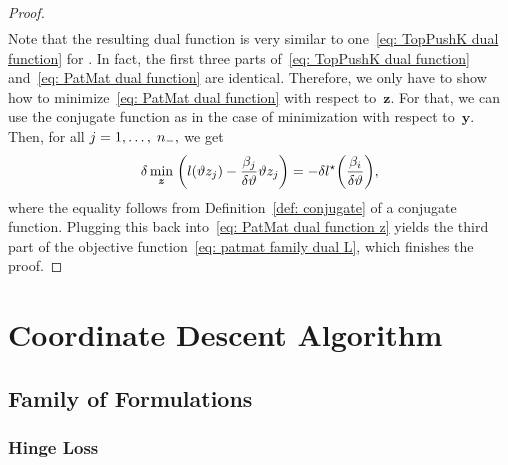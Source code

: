 \begin{proof}
\begin{subequations}
\begin{align}
    \end{align}
  \end{subequations}
  Note that the resulting dual function is very similar to one~\eqref{eq: TopPushK dual function} for \TopPushK. In fact, the first three parts of~\eqref{eq: TopPushK dual function} and~\eqref{eq: PatMat dual function} are identical. Therefore, we only have to show how to minimize~\eqref{eq: PatMat dual function} with respect to~$\bm{z}.$ For that, we can use the conjugate function as in the case of minimization with respect to~$\bm{y}.$ Then, for all $j = 1, \ldots, \; n_{-},$ we get 
  \begin{equation*}
    \delta \min_{\bm{z}} \; \Brac{l(\vartheta z_j) - \frac{\beta_j}{\delta\vartheta } \vartheta z_j} = - \delta l^{\star} \Brac{\frac{\beta_i}{\delta\vartheta }},
  \end{equation*}
  where the equality follows from Definition~\ref{def: conjugate} of a conjugate function. Plugging this back into~\eqref{eq: PatMat dual function z} yields the third part of the objective function~\eqref{eq: patmat family dual L}, which finishes the proof.
\end{proof}

\section{Coordinate Descent Algorithm}
\subsection{Family of \TopPushK Formulations}\label{sec: toppushk family coordinate proofs}
\subsubsection{Hinge Loss}

